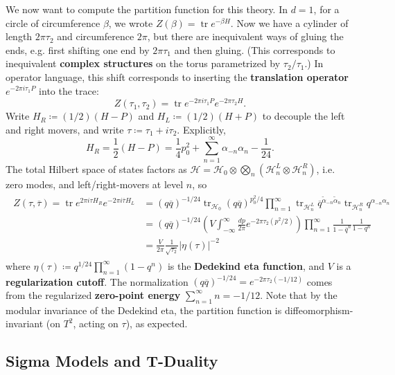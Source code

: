 \documentclass{report}
\theoremstyle{plain}
\theoremstyle{definition}
\theoremstyle{remark}
\newcommand{\cH}{\mathcal{H}}
\DeclareMathOperator{\tr}{tr}
\newcommand{\cnj}{\overline}
\begin{document}
We now want to compute the partition function for this theory. In
$d=1$, for a circle of circumference $\beta$, we wrote $Z(\beta) = \tr
e^{-\beta H}$. Now we have a cylinder of length $2\pi\tau_2$ and
circumference $2\pi$, but there are inequivalent ways of gluing the
ends, e.g. first shifting one end by $2\pi\tau_1$ and then gluing.
(This corresponds to inequivalent {\bf complex structures} on the
torus parametrized by $\tau_2/\tau_1$.) In operator language, this
shift corresponds to inserting the {\bf translation operator}
$e^{-2\pi i\tau_1 P}$ into the trace:
\[ Z(\tau_1, \tau_2) = \tr e^{-2\pi i\tau_1 P} e^{-2\pi \tau_2 H}. \]
Write $H_R \coloneqq (1/2)(H - P)$ and $H_L \coloneqq (1/2)(H + P)$ to
decouple the left and right movers, and write $\tau \coloneqq \tau_1 +
i\tau_2$. Explicitly,
\[ H_R = \frac{1}{2}(H - P) = \frac{1}{4} p_0^2 + \sum_{n=1}^\infty \alpha_{-n}\alpha_n - \frac{1}{24}. \]
The total Hilbert space of states factors as $\cH = \cH_0 \otimes
\bigotimes_n (\cH_n^L \otimes \cH_n^R)$, i.e. zero modes, and
left/right-movers at level $n$, so
\begin{align} \label{ex:2d-free-bosonic-sft-partition}
\begin{split}
  Z(\tau, \cnj\tau) = \tr e^{2\pi i\tau H_R} e^{-2\pi i\cnj\tau H_L}
  &= (q\cnj q)^{-1/24} \tr_{\cH_0} (q\cnj q)^{p_0^2/4} \prod_{n=1}^\infty \tr_{\cH_n^L} \cnj q^{\tilde\alpha_{-n} \tilde\alpha_n} \tr_{\cH_n^R} q^{\alpha_{-n}\alpha_n} \\
  &= (q\cnj q)^{-1/24} \left(V \int_{-\infty}^\infty \frac{dp}{2\pi} e^{-2\pi \tau_2(p^2/2)}\right) \prod_{n=1}^\infty \frac{1}{1 - \cnj q^n} \frac{1}{1 - q^n} \\
  &= \frac{V}{2\pi} \frac{1}{\sqrt{\tau_2}} |\eta(\tau)|^{-2}
\end{split}
\end{align}
where $\eta(\tau) \coloneqq q^{1/24} \prod_{n=1}^\infty (1 - q^n)$ is
the {\bf Dedekind eta function}, and $V$ is a {\bf regularization
  cutoff}. The normalization $(q\cnj q)^{-1/24} = e^{-2\pi \tau_2
  (-1/12)}$ comes from the regularized {\bf zero-point energy}
$\sum_{n=1}^\infty n = -1/12$. Note that by the modular invariance of
the Dedekind eta, the partition function is diffeomorphism-invariant
(on $T^2$, acting on $\tau$), as expected.
  
\subsection{Sigma Models and T-Duality}
\end{document}
